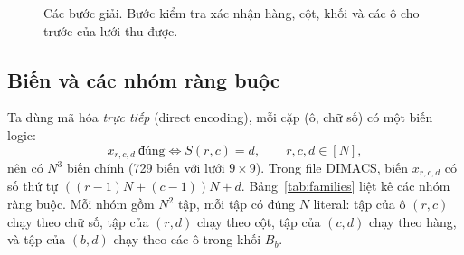 \documentclass[a4paper,fleqn]{cas-sc}
\begin{document}
\begin{figure}[t]
\centering
{}
\caption{Các bước giải. Bước kiểm tra xác nhận hàng, cột, khối và các ô cho trước của lưới thu được.}
\label{fig:pipeline}
\end{figure}

\subsection{Biến và các nhóm ràng buộc}\label{sec:vars}

Ta dùng mã hóa \emph{trực tiếp} (direct encoding), mỗi cặp (ô, chữ số) có một biến logic:
\begin{equation}
x_{r,c,d}\ \text{đúng}\iff S(r,c)=d,\qquad r,c,d\in[N], \label{eq:var}
\end{equation}
nên có $N^3$ biến chính (729 biến với lưới $9\times9$). Trong file DIMACS, biến $x_{r,c,d}$ có số thứ tự $((r-1)N+(c-1))N+d$. Bảng~\ref{tab:families} liệt kê các nhóm ràng buộc. Mỗi nhóm gồm $N^2$ tập, mỗi tập có đúng $N$ literal: tập của ô $(r,c)$ chạy theo chữ số, tập của $(r,d)$ chạy theo cột, tập của $(c,d)$ chạy theo hàng, và tập của $(b,d)$ chạy theo các ô trong khối $B_b$.
\end{document}
